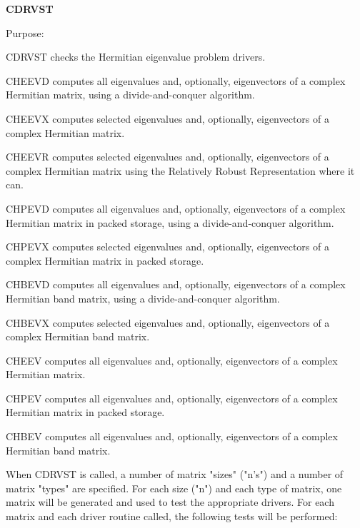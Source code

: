{\bfseries C\+D\+R\+V\+S\+T} 

\begin{DoxyParagraph}{Purpose\+: }
\begin{DoxyVerb}      CDRVST  checks the Hermitian eigenvalue problem drivers.

              CHEEVD computes all eigenvalues and, optionally,
              eigenvectors of a complex Hermitian matrix,
              using a divide-and-conquer algorithm.

              CHEEVX computes selected eigenvalues and, optionally,
              eigenvectors of a complex Hermitian matrix.

              CHEEVR computes selected eigenvalues and, optionally,
              eigenvectors of a complex Hermitian matrix
              using the Relatively Robust Representation where it can.

              CHPEVD computes all eigenvalues and, optionally,
              eigenvectors of a complex Hermitian matrix in packed
              storage, using a divide-and-conquer algorithm.

              CHPEVX computes selected eigenvalues and, optionally,
              eigenvectors of a complex Hermitian matrix in packed
              storage.

              CHBEVD computes all eigenvalues and, optionally,
              eigenvectors of a complex Hermitian band matrix,
              using a divide-and-conquer algorithm.

              CHBEVX computes selected eigenvalues and, optionally,
              eigenvectors of a complex Hermitian band matrix.

              CHEEV computes all eigenvalues and, optionally,
              eigenvectors of a complex Hermitian matrix.

              CHPEV computes all eigenvalues and, optionally,
              eigenvectors of a complex Hermitian matrix in packed
              storage.

              CHBEV computes all eigenvalues and, optionally,
              eigenvectors of a complex Hermitian band matrix.

      When CDRVST is called, a number of matrix "sizes" ("n's") and a
      number of matrix "types" are specified.  For each size ("n")
      and each type of matrix, one matrix will be generated and used
      to test the appropriate drivers.  For each matrix and each
      driver routine called, the following tests will be performed:


\end{DoxyVerb}
\end{DoxyParagraph}
